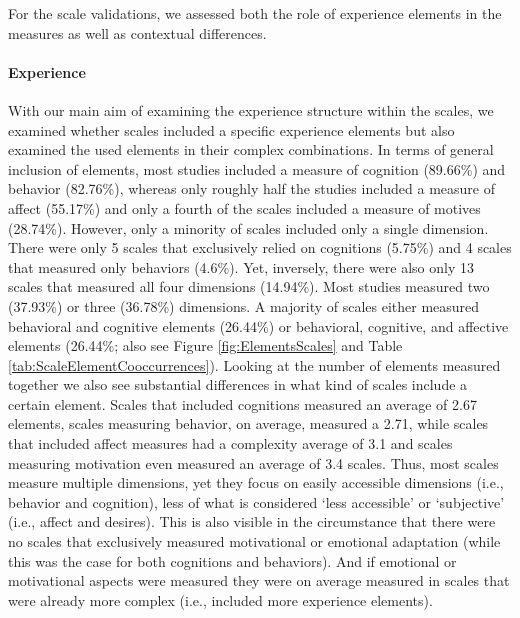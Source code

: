For the scale validations, we assessed both the role of experience
elements in the measures as well as contextual differences.

\paragraph{Experience}

With our main aim of examining the experience structure within the
scales, we examined whether scales included a specific experience
elements but also examined the used elements in their complex
combinations. In terms of general inclusion of elements, most studies
included a measure of cognition (89.66\%) and behavior (82.76\%),
whereas only roughly half the studies included a measure of affect
(55.17\%) and only a fourth of the scales included a measure of motives
(28.74\%). However, only a minority of scales included only a single
dimension. There were only 5 scales that exclusively relied on
cognitions (5.75\%) and 4 scales that measured only behaviors (4.6\%).
Yet, inversely, there were also only 13 scales that measured all four
dimensions (14.94\%). Most studies measured two (37.93\%) or three
(36.78\%) dimensions. A majority of scales either measured behavioral
and cognitive elements (26.44\%) or behavioral, cognitive, and affective
elements (26.44\%; also see Figure \ref{fig:ElementsScales} and Table
\ref{tab:ScaleElementCooccurrences}). Looking at the number of elements
measured together we also see substantial differences in what kind of
scales include a certain element. Scales that included cognitions
measured an average of 2.67 elements, scales measuring behavior, on
average, measured a 2.71, while scales that included affect measures had
a complexity average of 3.1 and scales measuring motivation even
measured an average of 3.4 scales. Thus, most scales measure multiple
dimensions, yet they focus on easily accessible dimensions (i.e.,
behavior and cognition), less of what is considered `less accessible' or
`subjective' (i.e., affect and desires). This is also visible in the
circumstance that there were no scales that exclusively measured
motivational or emotional adaptation (while this was the case for both
cognitions and behaviors). And if emotional or motivational aspects were
measured they were on average measured in scales that were already more
complex (i.e., included more experience elements).

